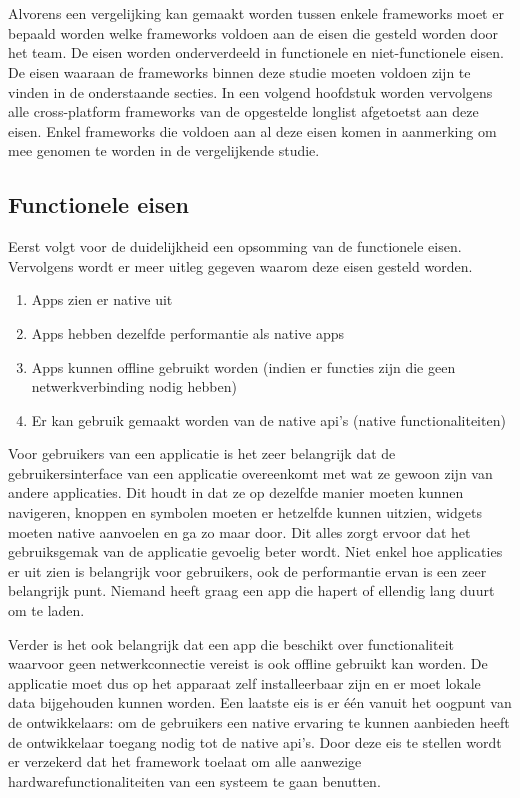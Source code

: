 \chapter{}
\label{ch:eisen-framework}

Alvorens een vergelijking kan gemaakt worden tussen enkele frameworks moet er bepaald worden welke frameworks voldoen aan de eisen die gesteld worden door het team. De eisen worden onderverdeeld in functionele en niet-functionele eisen. De eisen waaraan de frameworks binnen deze studie moeten voldoen zijn te vinden in de onderstaande secties. In een volgend hoofdstuk worden vervolgens alle cross-platform frameworks van de opgestelde longlist afgetoetst aan deze eisen. Enkel frameworks die voldoen aan al deze eisen komen in aanmerking om mee genomen te worden in de vergelijkende studie.

\section{Functionele eisen}

Eerst volgt voor de duidelijkheid een opsomming van de functionele eisen. Vervolgens wordt er meer uitleg gegeven waarom deze eisen gesteld worden.
\begin{enumerate}
    \item Apps zien er native uit
    \item Apps hebben dezelfde performantie als native apps
    \item Apps kunnen offline gebruikt worden (indien er functies zijn die geen netwerkverbinding nodig hebben)
    \item Er kan gebruik gemaakt worden van de native api's (native functionaliteiten)
\end{enumerate}

Voor gebruikers van een applicatie is het zeer belangrijk dat de gebruikersinterface van een applicatie overeenkomt met wat ze gewoon zijn van andere applicaties. Dit houdt in dat ze op dezelfde manier moeten kunnen navigeren, knoppen en symbolen moeten er hetzelfde kunnen uitzien, widgets moeten native aanvoelen en ga zo maar door. Dit alles zorgt ervoor dat het gebruiksgemak van de applicatie gevoelig beter wordt. Niet enkel hoe applicaties er uit zien is belangrijk voor gebruikers, ook de performantie ervan is een zeer belangrijk punt. Niemand heeft graag een app die hapert of ellendig lang duurt om te laden. 

Verder is het ook belangrijk dat een app die beschikt over functionaliteit waarvoor geen netwerkconnectie vereist is ook offline gebruikt kan worden. De applicatie moet dus op het apparaat zelf installeerbaar zijn en er moet lokale data bijgehouden kunnen worden. Een laatste eis is er één vanuit het oogpunt van de ontwikkelaars: om de gebruikers een native ervaring te kunnen aanbieden heeft de ontwikkelaar toegang nodig tot de native api's. Door deze eis te stellen wordt er verzekerd dat het framework toelaat om alle aanwezige hardwarefunctionaliteiten van een systeem te gaan benutten.

